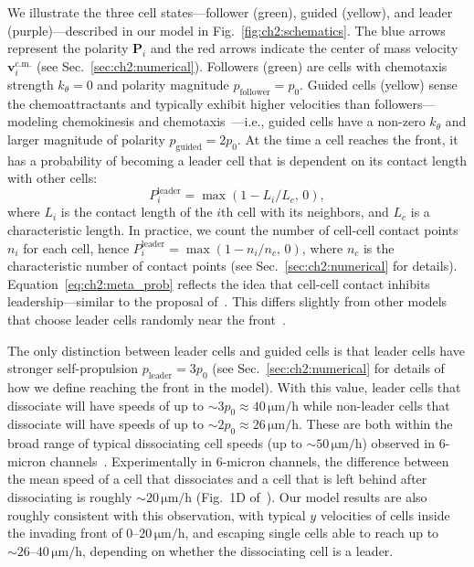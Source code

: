 We illustrate the three cell states---follower (green), guided (yellow), and leader (purple)---described in our model in Fig.~\ref{fig:ch2:schematics}.
The blue arrows represent the polarity $\mathbf{P}_i$ and the red arrows indicate the center of mass velocity $\mathbf{v}_i^{\textrm{c.m.}}$ (see Sec.~\ref{sec:ch2:numerical}).
Followers (green) are cells with chemotaxis strength $k_\theta=0$ and polarity magnitude $p_\textrm{follower}=p_0$.
Guided cells (yellow) sense the chemoattractants and typically exhibit higher velocities than followers---modeling chemokinesis and chemotaxis~\cite{sengupta2021principles}---i.e., guided cells have a non-zero $k_\theta$ and larger magnitude of polarity $p_\textrm{guided}=2p_0$.
At the time a cell reaches the front, it has a probability of becoming a leader cell that is dependent on its contact length with other cells:
\begin{equation}\label{eq:ch2:meta_prob}
P_i^\textrm{leader} = \max(1-L_i/L_c,\,0),
\end{equation}
where $L_i$ is the contact length of the $i$th cell with its neighbors, and $L_c$ is a characteristic length.
In practice, we count the number of cell-cell contact points $n_i$ for each cell, hence $P_i^\textrm{leader}=\max(1-n_i/n_c,\,0)$, where $n_c$ is the characteristic number of contact points (see Sec.~\ref{sec:ch2:numerical} for details).
Equation~\eqref{eq:ch2:meta_prob} reflects the idea that cell-cell contact inhibits leadership---similar to the proposal of~\cite{tarle2017modeling}.
This differs slightly from other models that choose leader cells randomly near the front~\cite{sepulveda2013collective, yang2020leader}.

The only distinction between leader cells and guided cells is that leader cells have stronger self-propulsion $p_\textrm{leader}=3p_0$ (see Sec.~\ref{sec:ch2:numerical} for details of how we define reaching the front in the model).
With this value, leader cells that dissociate will have speeds of up to $\sim 3 p_0 \approx 40\,\mathrm{\mu m/h}$ while non-leader cells that dissociate will have speeds of up to $\sim 2p_0 \approx 26\,\mathrm{\mu m/h}$.
These are both within the broad range of typical dissociating cell speeds (up to $\sim 50\,\mathrm{\mu m/h}$) observed in $6$-micron channels~\cite{law2023cytokinesis}.
Experimentally in $6$-micron channels, the difference between the mean speed of a cell that dissociates and a cell that is left behind after dissociating is roughly $\sim 20\,\mathrm{\mu m/h}$ (Fig.~1D of~\cite{law2023cytokinesis}).
Our model results are also roughly consistent with this observation, with typical $y$ velocities of cells inside the invading front of $0\textrm{--}20\,\mathrm{\mu m/h}$, and escaping single cells able to reach up to $\sim 26\textrm{--}40\,\mathrm{\mu m/h}$, depending on whether the dissociating cell is a leader.

